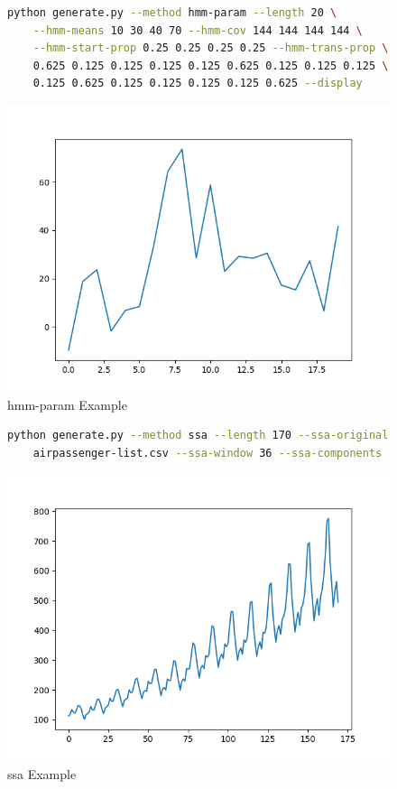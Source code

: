 \begin{figure}
\begin{lstlisting}[language=bash]
    python generate.py --method hmm-param --length 20 \
    --hmm-means 10 30 40 70 --hmm-cov 144 144 144 144 \
    --hmm-start-prop 0.25 0.25 0.25 0.25 --hmm-trans-prop \
    0.625 0.125 0.125 0.125 0.125 0.625 0.125 0.125 0.125 \
    0.125 0.625 0.125 0.125 0.125 0.125 0.625 --display
\end{lstlisting}
\includegraphics[scale=0.7]{figures/hmm-param}
\caption{hmm-param Example}    
\label{fig:hmm-param-example}
\end{figure}

\begin{figure}
\begin{lstlisting}[language=bash]
    python generate.py --method ssa --length 170 --ssa-original \
    airpassenger-list.csv --ssa-window 36 --ssa-components 13 --display
\end{lstlisting}
\includegraphics[scale=0.7]{figures/ssa}
\caption{ssa Example}    
\label{fig:ssa-example}
\end{figure}